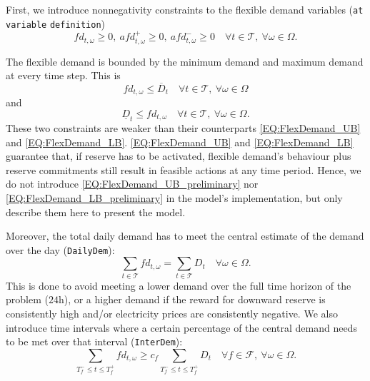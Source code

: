 \documentclass{article}
\begin{document}
First, we introduce nonnegativity constraints to the flexible demand variables (\verb|at variable| \verb|definition|)
\begin{equation} \label{EQ:FlexDemandPos}
	fd_{t, \omega} \geq 0, \ afd_{t, \omega}^+ \geq 0, \ afd_{t, \omega}^- \geq 0 \quad \forall t \in \mathcal{T}, \ \forall \omega \in \Omega.
\end{equation}

The flexible demand is bounded by the minimum demand and maximum demand at every time step. This is
\begin{equation} \label{EQ:FlexDemand_UB_preliminary}
	fd_{t, \omega} \leq \overline{D}_t \quad \forall t \in \mathcal{T}, \ \forall \omega \in \Omega
\end{equation}
and 
\begin{equation} \label{EQ:FlexDemand_LB_preliminary}
	\underline{D}_t \leq fd_{t, \omega} \quad \forall t \in \mathcal{T}, \ \forall \omega \in \Omega.
\end{equation}
These two constraints are weaker than their counterparts \eqref{EQ:FlexDemand_UB} and \eqref{EQ:FlexDemand_LB}. \eqref{EQ:FlexDemand_UB} and \eqref{EQ:FlexDemand_LB} guarantee that, if reserve has to be activated, flexible demand's behaviour plus reserve commitments still result in feasible actions at any time period. Hence, we do not introduce \eqref{EQ:FlexDemand_UB_preliminary} nor \eqref{EQ:FlexDemand_LB_preliminary} in the model's implementation, but only describe them here to present the model.

Moreover, the total daily demand has to meet the central estimate of the demand over the day (\verb|DailyDem|): 
\begin{equation} \label{EQ:DailyDem}
	\sum_{t \in \mathcal{T}} fd_{t, \omega} = \sum_{t \in \mathcal{T}} D_t \quad \forall \omega \in \Omega.
\end{equation}
This is done to avoid meeting a lower demand over the full time horizon of the problem ($24$h), or a higher demand if the reward for downward reserve is consistently high and/or electricity prices are consistently negative. We also introduce time intervals where a certain percentage of the central demand needs to be met over that interval (\verb|InterDem|):
\begin{equation} \label{EQ:InterDem}
	\sum_{T_f^- \leq t \leq T_f^+} fd_{t, \omega} \geq c_f \sum_{T_f^- \leq t \leq T_f^+} D_t \quad \forall f \in \mathcal{F}, \ \forall \omega \in \Omega.
\end{equation}
\end{document}
